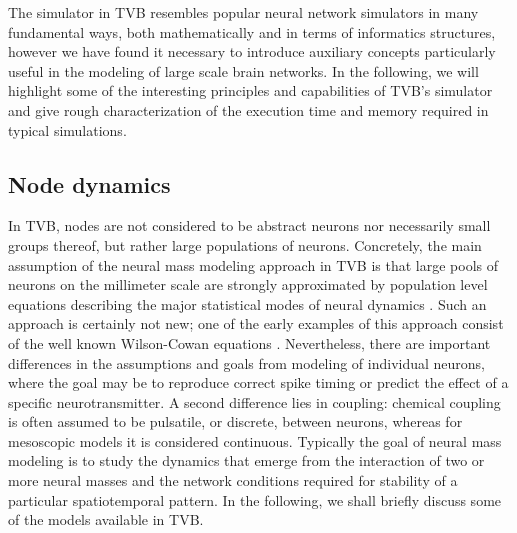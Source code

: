 \documentclass{bioinfo}
\begin{document}
The simulator in TVB resembles popular neural network simulators in 
many fundamental ways, both mathematically and in terms of informatics 
structures, however we have found it necessary to introduce auxiliary
concepts particularly useful in the modeling of large scale brain 
networks. In the following, we will highlight some of the interesting
principles and capabilities of TVB's simulator and give rough characterization
of the execution time and memory required in typical simulations.

\subsection{Node dynamics}

In TVB, nodes are not considered to be abstract neurons nor necessarily small
groups thereof, but rather large populations of neurons. Concretely, the main
assumption of the neural mass modeling approach in TVB is that large pools of
neurons on the millimeter scale are strongly approximated by population level
equations describing the major statistical modes of neural dynamics
\citep{Freeman_1975book}. Such an approach is certainly not new; one of the
early examples of this approach consist of the well known Wilson-Cowan
equations \citep{Wilson_1973}. Nevertheless, there are important differences in
the assumptions and goals from modeling of individual neurons, where the goal
may be to reproduce correct spike timing or predict the effect of  a specific
neurotransmitter. A second difference lies in coupling: chemical coupling is
often assumed to be pulsatile, or discrete, between neurons, whereas for
mesoscopic models it is considered continuous. Typically the goal of neural
mass modeling is to study the dynamics that emerge from the interaction of two
or more neural masses and the network conditions required for stability of a
particular spatiotemporal pattern. In the following, we shall  briefly discuss
some of the models available in TVB.
\end{document}
